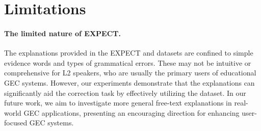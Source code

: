 





\section{Limitations}
\label{sec:limitations}

\paragraph{The limited nature of EXPECT.}
The explanations provided in the EXPECT and \Dataset{} datasets are confined to simple evidence words and types of grammatical errors. These may not be intuitive or comprehensive for L2 speakers, who are usually the primary users of educational GEC systems. However, our experiments demonstrate that the explanations can significantly aid the correction task by effectively utilizing the \Dataset{} dataset. In our future work, we aim to investigate more general free-text explanations in real-world GEC applications, presenting an encouraging direction for enhancing user-focused GEC systems.

